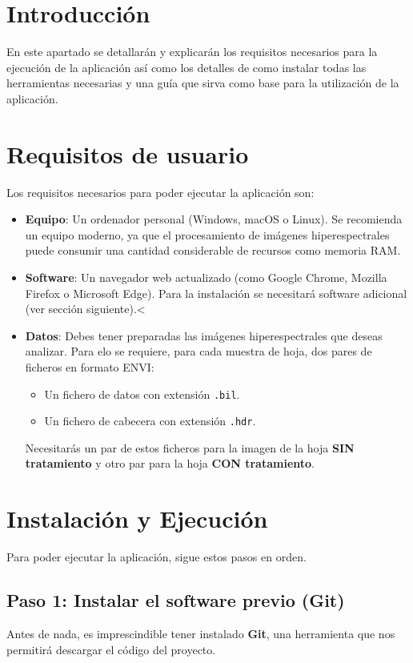 \label{apendice:usuario}

\section{Introducción}
En este apartado se detallarán y explicarán los requisitos necesarios para la ejecución de la aplicación así como los detalles de como instalar todas las herramientas necesarias y una guía que sirva como base para la utilización de la aplicación.

\section{Requisitos de usuario}
Los requisitos necesarios para poder ejecutar la aplicación son:

\begin{itemize}
\item \textbf{Equipo}: Un ordenador personal (Windows, macOS o Linux). Se recomienda un equipo moderno, ya que el procesamiento de imágenes hiperespectrales puede consumir una cantidad considerable de recursos como memoria RAM.
\item \textbf{Software}: Un navegador web actualizado (como Google Chrome, Mozilla Firefox o Microsoft Edge). Para la instalación se necesitará software adicional (ver sección siguiente).<
\item \textbf{Datos}: Debes tener preparadas las imágenes hiperespectrales que deseas analizar. Para elo se requiere, para cada muestra de hoja, dos pares de ficheros en formato ENVI:
\begin{itemize}
\item Un fichero de datos con extensión \texttt{.bil}.
\item Un fichero de cabecera con extensión \texttt{.hdr}.
\end{itemize}
Necesitarás un par de estos ficheros para la imagen de la hoja \textbf{SIN tratamiento} y otro par para la hoja \textbf{CON tratamiento}.
\end{itemize}

\section{Instalación y Ejecución}
Para poder ejecutar la aplicación, sigue estos pasos en orden.

\subsection{Paso 1: Instalar el software previo (Git)}
Antes de nada, es imprescindible tener instalado \textbf{Git}, una herramienta que nos permitirá descargar el código del proyecto.

